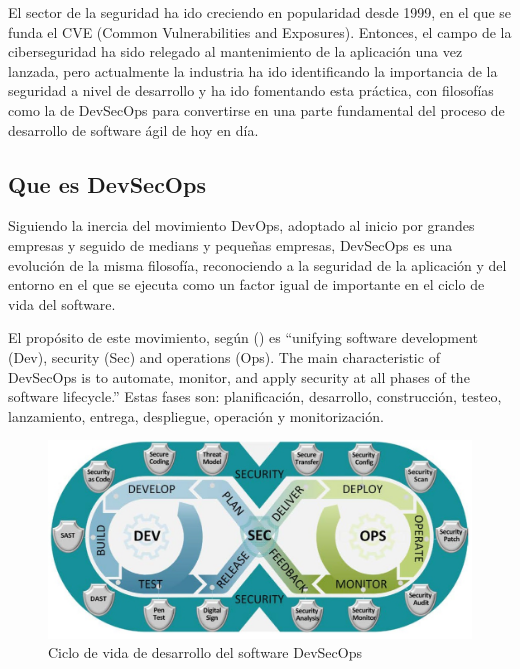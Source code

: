 \documentclass[12pt]{report} %
\begin{document}
El sector de la seguridad ha ido creciendo en popularidad desde 1999, en el que
se funda el CVE (Common Vulnerabilities and Exposures).  Entonces, el campo de
la ciberseguridad ha sido relegado al mantenimiento de la aplicación una vez
lanzada, pero actualmente la industria ha ido identificando la importancia de la
seguridad a nivel de desarrollo y ha ido fomentando esta práctica, con
filosofías como la de DevSecOps para convertirse en una parte fundamental del
proceso de desarrollo de software ágil de hoy en día.

\subsection{Que es DevSecOps}

Siguiendo la inercia del movimiento DevOps, adoptado al inicio por grandes
empresas y seguido de medians y pequeñas empresas, DevSecOps es una evolución de
la misma filosofía, reconociendo a la seguridad de la aplicación y del entorno
en el que se ejecuta como un factor igual de importante en el ciclo de vida del
software.

El propósito de este movimiento, según (\cite{DOD2019}) es 
``unifying software development (Dev), security (Sec) and operations (Ops). The
main characteristic of DevSecOps is to automate, monitor, and apply security at
all phases of the software lifecycle.''
Estas fases son: planificación, desarrollo, construcción, testeo, lanzamiento,
entrega, despliegue, operación y monitorización.

\begin{figure}[H]
  \includegraphics[width=\textwidth]{devsecops} 
  \caption{Ciclo de vida de desarrollo del software DevSecOps}
  \label{fig:DevSecOps-SDLC}
\end{figure}
\end{document}
